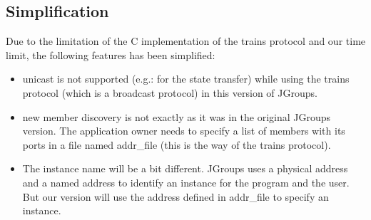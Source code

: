 \documentclass[a4paper,10pt]{report}
\begin{document}
\subsection{Simplification}
Due to the limitation of the C implementation of the trains protocol and our time limit, the following features has been simplified:
\begin{itemize}
\item unicast is not supported (e.g.: for the state transfer) while using the trains protocol (which is a broadcast protocol) in this version of JGroups.
\item new member discovery is not exactly as it was in the original JGroups version. The application owner needs to specify a list of members with its ports in a file named addr\_file (this is the way of the trains protocol).
\item The instance name will be a bit different. JGroups uses a physical address and a named address to identify an instance for the program and the user. But our version will use the address defined in addr\_file to specify an instance.
\end{itemize}
\end{document}
